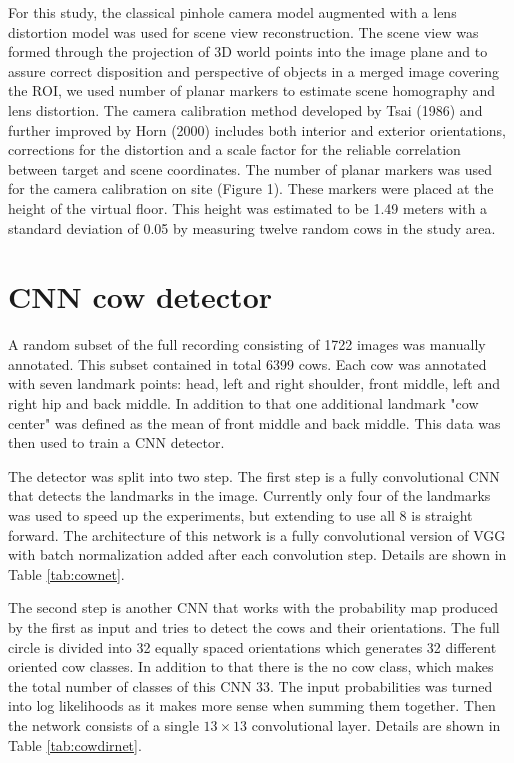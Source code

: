 \documentclass[10pt,a4paper,twocolumn]{article}
\begin{document}
For this study, the classical pinhole camera model augmented with a lens distortion model was used for scene view
reconstruction. The scene view was formed through the projection of 3D world points into the image
plane and to assure correct disposition and perspective of objects in a merged image covering the ROI, we used
number of planar markers to estimate scene homography and lens distortion. The camera calibration method
developed by Tsai (1986) and further improved by Horn (2000) includes both interior and exterior orientations,
corrections for the distortion and a scale factor for the reliable correlation between target and scene coordinates.
The number of planar markers was used for the camera calibration on site (Figure 1). These markers were placed
at the height of the virtual floor. This height was estimated to be 1.49 meters with a standard deviation of 0.05 by
measuring twelve random cows in the study area.

\section{CNN cow detector}

A random subset of the full recording consisting of 1722 images was manually annotated. This subset contained in total 6399 cows. Each cow was annotated with seven landmark points: head, left and right shoulder, front middle, left and right hip and back middle. In addition to that one additional landmark "cow center" was defined as the mean of front middle and back middle. This data was then used to train a CNN detector.

The detector was split into two step. The first step is a fully convolutional CNN that detects the landmarks in the image. Currently only four of the landmarks was used to speed up the experiments, but extending to use all 8 is straight forward. The architecture of this network is a fully convolutional version of VGG \cite{Simonyan14c} with batch normalization \cite{DBLP:journals/corr/IoffeS15} added after each convolution step. Details are shown in Table \ref{tab:cownet}.

The second step is another CNN that works with the probability map produced by the first as input and tries to detect the cows and their orientations. The full circle is divided into 32 equally spaced orientations which generates 32 different oriented cow classes. In addition to that there is the no cow class, which makes the total number of classes of this CNN 33. The input probabilities was turned into log likelihoods as it makes more sense when summing them together. Then the network consists of a single $ 13 \times 13 $ convolutional layer. Details are shown in Table \ref{tab:cowdirnet}.
\end{document}
